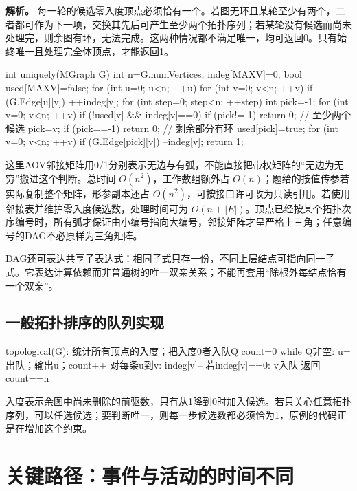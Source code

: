 \textbf{解析。} 每一轮的候选零入度顶点必须恰有一个。若图无环且某轮至少有两个，二者都可作为下一项，交换其先后可产生至少两个拓扑序列；若某轮没有候选而尚未处理完，则余图有环，无法完成。这两种情况都不满足唯一，均可返回0。只有始终唯一且处理完全体顶点，才能返回1。

\begin{codeblock}[language=C]
int uniquely(MGraph G) {
    int n=G.numVertices, indeg[MAXV]={0};
    bool used[MAXV]={false};
    for (int u=0; u<n; ++u)
        for (int v=0; v<n; ++v)
            if (G.Edge[u][v]) ++indeg[v];
    for (int step=0; step<n; ++step) {
        int pick=-1;
        for (int v=0; v<n; ++v)
            if (!used[v] && indeg[v]==0) {
                if (pick!=-1) return 0; // 至少两个候选
                pick=v;
            }
        if (pick==-1) return 0;         // 剩余部分有环
        used[pick]=true;
        for (int v=0; v<n; ++v)
            if (G.Edge[pick][v]) --indeg[v];
    }
    return 1;
}
\end{codeblock}

这里AOV邻接矩阵用0/1分别表示无边与有弧，不能直接把带权矩阵的``无边为无穷''搬进这个判断。总时间 \(O(n^2)\)，工作数组额外占 \(O(n)\)；题给的按值传参若实际复制整个矩阵，形参副本还占 \(O(n^2)\)，可按接口许可改为只读引用。若使用邻接表并维护零入度候选数，处理时间可为 \(O(n+|E|)\)。顶点已经按某个拓扑次序编号时，所有弧才保证由小编号指向大编号，邻接矩阵才呈严格上三角；任意编号的DAG不必原样为三角矩阵。

DAG还可表达共享子表达式：相同子式只存一份，不同上层结点可指向同一子式。它表达计算依赖而非普通树的唯一双亲关系；不能再套用``除根外每结点恰有一个双亲''。

\subsection{一般拓扑排序的队列实现}\label{DS06-topo-code}

\begin{codeblock}[language={}]
topological(G):
    统计所有顶点的入度；把入度0者入队Q
    count=0
    while Q非空:
        u=出队；输出u；count++
        对每条u到v: indeg[v]--
            若indeg[v]==0: v入队
    返回count==n
\end{codeblock}

入度表示余图中尚未删除的前驱数，只有从1降到0时加入候选。若只关心任意拓扑序列，可以任选候选；要判断唯一，则每一步候选数都必须恰为1，原例的代码正是在增加这个约束。

\section{关键路径：事件与活动的时间不同}\label{DS06-09}

